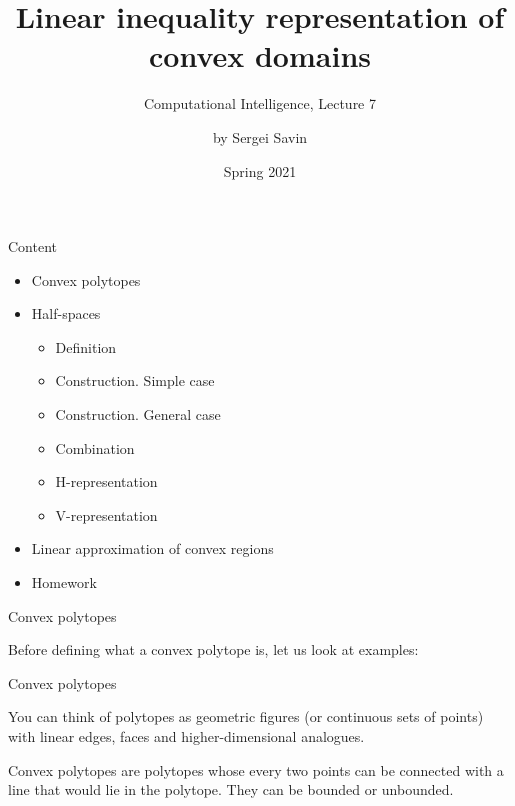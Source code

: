 \documentclass{beamer}
\title{Linear inequality representation of convex domains}
\subtitle{Computational Intelligence, Lecture 7}
\author{by Sergei Savin}
\date{Spring 2021}
\begin{document}
\maketitle


\begin{frame}{Content}

\begin{itemize}
\item Convex polytopes
\item Half-spaces
\begin{itemize}
\item Definition
\item Construction. Simple case
\item Construction. General case
\item Combination
\item H-representation
\item V-representation
\end{itemize}
\item Linear approximation of convex regions
\item Homework
\end{itemize}

\end{frame}



\begin{frame}{Convex polytopes}
\begin{flushleft}

Before defining what a convex polytope is, let us look at examples:


 
\end{flushleft}
\end{frame}


\begin{frame}{Convex polytopes}
\begin{flushleft}

You can think of polytopes as geometric figures (or continuous sets of points) with linear edges, faces and higher-dimensional analogues.

\bigskip

\begin{definition}
 Convex polytopes are polytopes whose every two points can be connected with a line that would lie in the polytope. They can be bounded or unbounded.
\end{definition}
 
\end{flushleft}
\end{frame}
\end{document}
